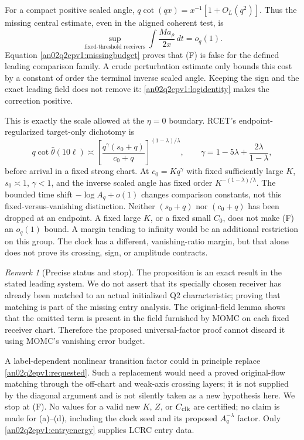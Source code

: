 \documentclass[11pt]{article}
\theoremstyle{remark}\newtheorem{remark}[theorem]{Remark}
\newcommand{\dd}{\,d}
\begin{document}
For a compact positive scaled angle, $q\cot(qx)=x^{-1}
[1+O_L(q^2)]$. Thus the missing central estimate, even in the
aligned coherent test, is
\begin{equation}
 \sup_{\text{fixed-threshold receivers}}
 \int \frac{M a_\rho}{2x}\dd t=o_q(1).
 \tag{F}\label{an02q2epv1:failedinequality}
\end{equation}
Equation \eqref{an02q2epv1:missingbudget} proves that (F) is false
for the defined leading comparison family. A crude perturbation
estimate only bounds this cost by a constant of order the
terminal inverse scaled angle. Keeping the sign and the exact
leading field does not remove it:
\eqref{an02q2epv1:logidentity} makes the correction positive.

This is exactly the scale allowed at the $\eta=0$ boundary.
RCET's endpoint-regularized target-only dichotomy is
\[
 q\cot\widehat\theta(10\ell)\asymp
 \left[\frac{q^\gamma(s_0+q)}{c_0+q}\right]^{(1-\lambda)/\lambda},
 \qquad
 \gamma=1-5\lambda+\frac{2\lambda}{1-\lambda},
\]
before arrival in a fixed strong chart.
At $c_0=Kq^\gamma$ with fixed sufficiently large $K$,
$s_0\asymp1$, $\gamma<1$, and the inverse scaled angle has
fixed order $K^{-(1-\lambda)/\lambda}$.
The bounded time shift $-\log A_q+o(1)$ changes comparison
constants, not this fixed-versus-vanishing distinction.
Neither $(s_0+q)$ nor $(c_0+q)$ has been dropped at an endpoint.
A fixed large $K$, or a fixed small $C_0$, does not make (F)
an $o_q(1)$ bound. A margin tending to infinity would be an
additional restriction on this group. The clock has a different,
vanishing-ratio margin, but that alone does not prove its crossing,
sign, or amplitude contracts.

\begin{remark}[Precise status and stop]\label{an02q2epv1:stop}
The proposition is an exact result in the stated leading system.
We do not assert that its specially chosen receiver has already
been matched to an actual initialized Q2 characteristic; proving
that matching is part of the missing entry analysis.
The original-field lemma shows that the omitted term is present
in the field furnished by MOMC on each fixed receiver chart.
Therefore the proposed universal-factor proof cannot discard it
using MOMC's vanishing error budget.

A label-dependent nonlinear transition factor could in principle
replace \eqref{an02q2epv1:requested}. Such a replacement would need
a proved original-flow matching through the off-chart and
weak-axis crossing layers; it is not supplied by the diagonal
argument and is not silently taken as a new hypothesis here.
We stop at (F). No values for a valid new $K$, $Z$, or $C_{\rm clk}$
are certified; no claim is made for (a)--(d), including the
clock seed and its proposed $A_q^{-\lambda}$ factor.
Only \eqref{an02q2epv1:entryenergy} supplies LCRC entry data.
\end{remark}
\end{document}
